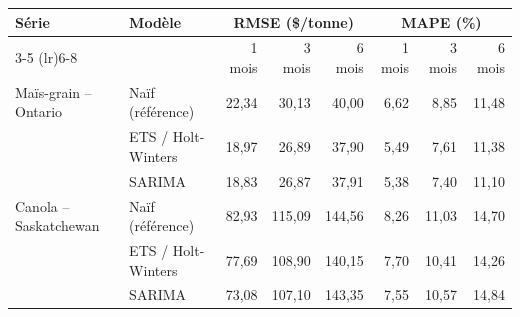 \begin{tabular}{llrrrrrr}
\toprule
Série & Modèle & \multicolumn{3}{c}{RMSE (\$/tonne)} & \multicolumn{3}{c}{MAPE (\%)} \\
\cmidrule(lr){3-5} \cmidrule(lr){6-8}
& & 1 mois & 3 mois & 6 mois & 1 mois & 3 mois & 6 mois \\
\midrule
Maïs-grain -- Ontario & Naïf (référence) & 22,34 & 30,13 & 40,00 & 6,62 & 8,85 & 11,48 \\
 & ETS / Holt-Winters & 18,97 & 26,89 & 37,90 & 5,49 & 7,61 & 11,38 \\
 & SARIMA & 18,83 & 26,87 & 37,91 & 5,38 & 7,40 & 11,10 \\
\midrule
Canola -- Saskatchewan & Naïf (référence) & 82,93 & 115,09 & 144,56 & 8,26 & 11,03 & 14,70 \\
 & ETS / Holt-Winters & 77,69 & 108,90 & 140,15 & 7,70 & 10,41 & 14,26 \\
 & SARIMA & 73,08 & 107,10 & 143,35 & 7,55 & 10,57 & 14,84 \\
\bottomrule
\end{tabular}
